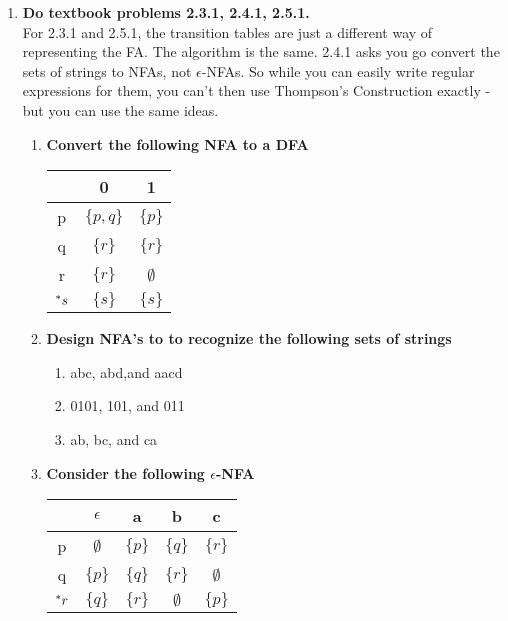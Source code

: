 \begin{enumerate}
\begin{figure}
\end{figure}

\newpage
\item \textbf{Do textbook problems 2.3.1, 2.4.1, 2.5.1.}
\\ For 2.3.1 and 2.5.1, the transition tables are just a different way of representing the FA. The algorithm is the same.
2.4.1 asks you go convert the sets of strings to NFAs, not $\epsilon$-NFAs. So while you can easily write regular expressions for them, you can't then use Thompson's Construction exactly -  but you can use the same ideas.
\begin{enumerate}
	\item \textbf{Convert the following NFA to a DFA}
	\begin{table}[H]
						\centering
		\begin{tabular}{c||c|c}
			 &  0 &  1   \\ \hline
			p& $\{p,q\}$ &  $\{p\}$   \\ \hline
			q&  $\{r\}$& $\{r\}$   \\ \hline
			r&  $\{r\}$& $\emptyset$   \\ \hline
			${}^\ast s$& $\{s\}$ & $\{s\}$ \\ \hline
		\end{tabular}
	\end{table}

	\item \textbf{Design NFA's to to recognize the following sets of strings}
		\begin{enumerate}
			\item abc, abd,and aacd 
			\item 0101, 101, and 011
			\item ab, bc, and ca 
		\end{enumerate}

	\item \textbf{Consider the following $\epsilon$-NFA}

		\begin{table}[H]
				\centering
		\begin{tabular}{c||c|c|c|c}
			&  $\epsilon$ &  a   & b & c\\ \hline
			p&  $\emptyset$ &  $\{p\}$  & $\{q\}$& $\{r\}$ \\ \hline
			q&  $\{p\}$& $\{q\}$   & $\{r\}$ &  $\emptyset$\\ \hline
			${}^\ast r$&  $\{q\}$& $\{r\}$ &  $\emptyset$ & $\{p\}$ \\ \hline
		\end{tabular}
	\end{table}


\end{enumerate}
\end{enumerate}
